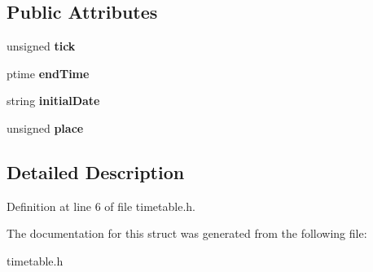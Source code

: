 \subsection*{Public Attributes}
\begin{DoxyCompactItemize}
\item 
\mbox{\label{structevent_aeb16a5736888611f5424e5da280b5cbd}} 
unsigned {\bfseries tick}
\item 
\mbox{\label{structevent_a763d19924574b410961a3423385f110a}} 
ptime {\bfseries end\+Time}
\item 
\mbox{\label{structevent_aa85754648c3695f2284ed9c2ac726d33}} 
string {\bfseries initial\+Date}
\item 
\mbox{\label{structevent_ae963ec1a3906a288458ce5f754d17482}} 
unsigned {\bfseries place}
\end{DoxyCompactItemize}


\subsection{Detailed Description}


Definition at line 6 of file timetable.\+h.



The documentation for this struct was generated from the following file\+:\begin{DoxyCompactItemize}
\item 
timetable.\+h\end{DoxyCompactItemize}
